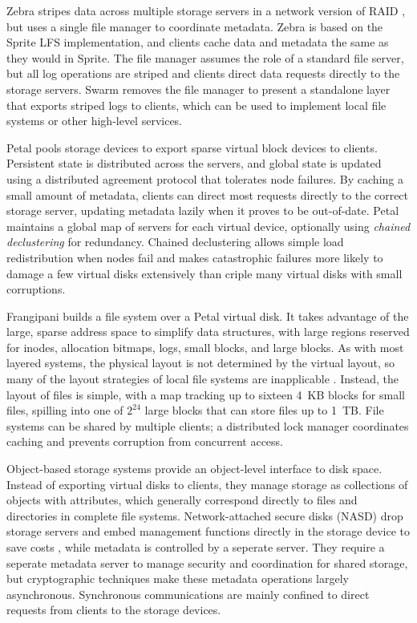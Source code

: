 Zebra \cite{hartman93} stripes data across multiple storage servers in a network version of RAID \cite{patterson}, but uses a single file manager to coordinate metadata. Zebra is based on the Sprite LFS implementation, and clients cache data and metadata the same as they would in Sprite. The file manager assumes the role of a standard file server, but all log operations are striped and clients direct data requests directly to the storage servers. Swarm \cite{hartman99} removes the file manager to present a standalone layer that exports striped logs to clients, which can be used to implement local file systems or other high-level services.

Petal \cite{lee95,lee96} pools storage devices to export sparse virtual block devices to clients. Persistent state is distributed across the servers, and global state is updated using a distributed agreement protocol that tolerates node failures. By caching a small amount of metadata, clients can direct most requests directly to the correct storage server, updating metadata lazily when it proves to be out-of-date. Petal maintains a global map of servers for each virtual device, optionally using \emph{chained declustering} for redundancy. Chained declustering \cite{hsiao} allows simple load redistribution when nodes fail and makes catastrophic failures more likely to damage a few virtual disks extensively than criple many virtual disks with small corruptions.

Frangipani \cite{thekkath} builds a file system over a Petal virtual disk. It takes advantage of the large, sparse address space to simplify data structures, with large regions reserved for inodes, allocation bitmaps, logs, small blocks, and large blocks. As with most layered systems, the physical layout is not determined by the virtual layout, so many of the layout strategies of local file systems are inapplicable \cite{stein05}. Instead, the layout of files is simple, with a map tracking up to sixteen 4~KB blocks for small files, spilling into one of $2^{24}$ large blocks that can store files up to 1~TB. File systems can be shared by multiple clients; a distributed lock manager coordinates caching and prevents corruption from concurrent access.

Object-based storage systems \cite{factor,mesnier} provide an object-level interface to disk space. Instead of exporting virtual disks to clients, they manage storage as collections of objects with attributes, which generally correspond directly to files and directories in complete file systems. Network-attached secure disks (NASD) drop storage servers and embed management functions directly in the storage device to save costs \cite{gibson97,gibson98a}, while metadata is controlled by a seperate server. They require a seperate metadata server to manage security and coordination for shared storage, but cryptographic techniques make these metadata operations largely asynchronous. Synchronous communications are mainly confined to direct requests from clients to the storage devices. 

